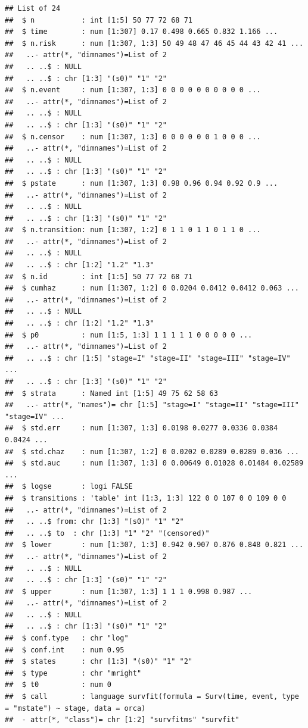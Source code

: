 \documentclass[
]{book}
\begin{document}
\begin{verbatim}
## List of 24
##  $ n           : int [1:5] 50 77 72 68 71
##  $ time        : num [1:307] 0.17 0.498 0.665 0.832 1.166 ...
##  $ n.risk      : num [1:307, 1:3] 50 49 48 47 46 45 44 43 42 41 ...
##   ..- attr(*, "dimnames")=List of 2
##   .. ..$ : NULL
##   .. ..$ : chr [1:3] "(s0)" "1" "2"
##  $ n.event     : num [1:307, 1:3] 0 0 0 0 0 0 0 0 0 0 ...
##   ..- attr(*, "dimnames")=List of 2
##   .. ..$ : NULL
##   .. ..$ : chr [1:3] "(s0)" "1" "2"
##  $ n.censor    : num [1:307, 1:3] 0 0 0 0 0 0 1 0 0 0 ...
##   ..- attr(*, "dimnames")=List of 2
##   .. ..$ : NULL
##   .. ..$ : chr [1:3] "(s0)" "1" "2"
##  $ pstate      : num [1:307, 1:3] 0.98 0.96 0.94 0.92 0.9 ...
##   ..- attr(*, "dimnames")=List of 2
##   .. ..$ : NULL
##   .. ..$ : chr [1:3] "(s0)" "1" "2"
##  $ n.transition: num [1:307, 1:2] 0 1 1 0 1 1 0 1 1 0 ...
##   ..- attr(*, "dimnames")=List of 2
##   .. ..$ : NULL
##   .. ..$ : chr [1:2] "1.2" "1.3"
##  $ n.id        : int [1:5] 50 77 72 68 71
##  $ cumhaz      : num [1:307, 1:2] 0 0.0204 0.0412 0.0412 0.063 ...
##   ..- attr(*, "dimnames")=List of 2
##   .. ..$ : NULL
##   .. ..$ : chr [1:2] "1.2" "1.3"
##  $ p0          : num [1:5, 1:3] 1 1 1 1 1 0 0 0 0 0 ...
##   ..- attr(*, "dimnames")=List of 2
##   .. ..$ : chr [1:5] "stage=I" "stage=II" "stage=III" "stage=IV" ...
##   .. ..$ : chr [1:3] "(s0)" "1" "2"
##  $ strata      : Named int [1:5] 49 75 62 58 63
##   ..- attr(*, "names")= chr [1:5] "stage=I" "stage=II" "stage=III" "stage=IV" ...
##  $ std.err     : num [1:307, 1:3] 0.0198 0.0277 0.0336 0.0384 0.0424 ...
##  $ std.chaz    : num [1:307, 1:2] 0 0.0202 0.0289 0.0289 0.036 ...
##  $ std.auc     : num [1:307, 1:3] 0 0.00649 0.01028 0.01484 0.02589 ...
##  $ logse       : logi FALSE
##  $ transitions : 'table' int [1:3, 1:3] 122 0 0 107 0 0 109 0 0
##   ..- attr(*, "dimnames")=List of 2
##   .. ..$ from: chr [1:3] "(s0)" "1" "2"
##   .. ..$ to  : chr [1:3] "1" "2" "(censored)"
##  $ lower       : num [1:307, 1:3] 0.942 0.907 0.876 0.848 0.821 ...
##   ..- attr(*, "dimnames")=List of 2
##   .. ..$ : NULL
##   .. ..$ : chr [1:3] "(s0)" "1" "2"
##  $ upper       : num [1:307, 1:3] 1 1 1 0.998 0.987 ...
##   ..- attr(*, "dimnames")=List of 2
##   .. ..$ : NULL
##   .. ..$ : chr [1:3] "(s0)" "1" "2"
##  $ conf.type   : chr "log"
##  $ conf.int    : num 0.95
##  $ states      : chr [1:3] "(s0)" "1" "2"
##  $ type        : chr "mright"
##  $ t0          : num 0
##  $ call        : language survfit(formula = Surv(time, event, type = "mstate") ~ stage, data = orca)
##  - attr(*, "class")= chr [1:2] "survfitms" "survfit"
\end{verbatim}
\end{document}

